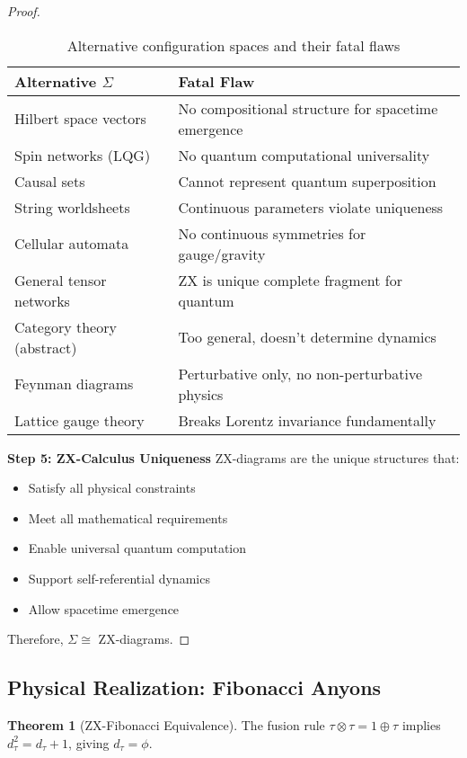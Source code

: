 \documentclass[11pt]{article}
\theoremstyle{definition}
\newtheorem{theorem}{Theorem}[section]
\newcommand{\goldenratio}{\phi}
\newcommand{\configspace}{\Sigma}
\newcommand{\fibonacci}{\tau}
\begin{document}
\begin{proof}
\begin{table}[h]
\centering
\caption{Alternative configuration spaces and their fatal flaws}
\begin{tabular}{ll}
\toprule
Alternative $\configspace$ & Fatal Flaw \\
\midrule
Hilbert space vectors & No compositional structure for spacetime emergence \\
Spin networks (LQG) & No quantum computational universality \\
Causal sets & Cannot represent quantum superposition \\
String worldsheets & Continuous parameters violate uniqueness \\
Cellular automata & No continuous symmetries for gauge/gravity \\
General tensor networks & ZX is unique complete fragment for quantum \\
Category theory (abstract) & Too general, doesn't determine dynamics \\
Feynman diagrams & Perturbative only, no non-perturbative physics \\
Lattice gauge theory & Breaks Lorentz invariance fundamentally \\
\bottomrule
\end{tabular}
\end{table}

\textbf{Step 5: ZX-Calculus Uniqueness}
ZX-diagrams are the unique structures that:
\begin{itemize}
\item Satisfy all physical constraints
\item Meet all mathematical requirements
\item Enable universal quantum computation
\item Support self-referential dynamics
\item Allow spacetime emergence
\end{itemize}

Therefore, $\configspace \cong$ ZX-diagrams.
\end{proof}

\subsection{Physical Realization: Fibonacci Anyons}

\begin{theorem}[ZX-Fibonacci Equivalence]
The fusion rule $\fibonacci \otimes \fibonacci = 1 \oplus \fibonacci$ implies $d_\fibonacci^2 = d_\fibonacci + 1$, giving $d_\fibonacci = \goldenratio$.
\end{theorem}
\end{document}
